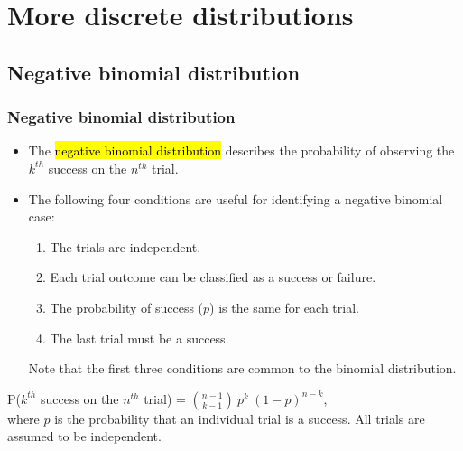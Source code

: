 
\section{More discrete distributions}


\subsection{Negative binomial distribution}


\begin{frame}
\frametitle{Negative binomial distribution}

\begin{itemize}

\item The \hl{negative binomial distribution} describes the probability of observing the $k^{th}$ success on the $n^{th}$ trial.

\item The following four conditions are useful for identifying a negative binomial case:
\begin{enumerate}
\item The trials are independent.
\item Each trial outcome can be classified as a success or failure.
\item The probability of success ($p$) is the same for each trial.
\item The last trial must be a success.
\end{enumerate}
Note that the first three conditions are common to the binomial distribution.

\end{itemize}

\vfill

{
P($k^{th}$ success on the $n^{th}$ trial) = ${n-1 \choose k-1}~p^k~(1-p)^{n-k}$, \\
where $p$ is the probability that an individual trial is a success. All trials are assumed to be independent.
}

\end{frame}


